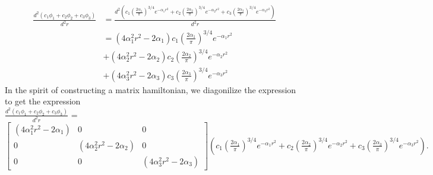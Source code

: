 \documentclass{article}
\begin{document}
\begin{align*}
    \frac{d^2(c_1 \phi_1 + c_2 \phi_2 + c_3 \phi_3)}{d^2r} &= \frac{d^2(c_1  \left( \frac{2\alpha_1}{\pi} \right)^{3/4} e^{-\alpha_1 r^2} + c_2 \left( \frac{2\alpha_2}{\pi} \right)^{3/4} e^{-\alpha_2 r^2} + c_3 \left( \frac{2\alpha_3}{\pi} \right)^{3/4} e^{-\alpha_3 r^2})}{d^2r} \\
                                                           &= (4\alpha_1^2r^2 - 2\alpha_1)c_1  \left( \frac{2\alpha_1}{\pi} \right)^{3/4} e^{-\alpha_1 r^2} \\
                                                           &+(4\alpha_2^2r^2 - 2\alpha_2)c_2  \left( \frac{2\alpha_2}{\pi} \right)^{3/4} e^{-\alpha_2 r^2}  \\
                                                           &+(4\alpha_3^2r^2 - 2\alpha_3)c_3  \left( \frac{2\alpha_3}{\pi} \right)^{3/4} e^{-\alpha_3 r^2}
\end{align*}
In the spirit of constructing a matrix hamiltonian, we diagonilize the expression to get the expression \\
 \(\frac{d^2(c_1 \phi_1 + c_2 \phi_2 + c_3 \phi_3)}{d^2r}\) = \\
$\begin{bmatrix}
    (4\alpha_1^2r^2 - 2\alpha_1) & 0 & 0\\
    0 & (4\alpha_2^2r^2 - 2\alpha_2) & 0 \\
    0& 0& (4\alpha_3^2r^2 - 2\alpha_3)
\end{bmatrix} (c_1  \left( \frac{2\alpha_1}{\pi} \right)^{3/4} e^{-\alpha_1 r^2} + c_2 \left( \frac{2\alpha_2}{\pi} \right)^{3/4} e^{-\alpha_2 r^2} + c_3 \left( \frac{2\alpha_3}{\pi} \right)^{3/4} e^{-\alpha_3 r^2}).$
\end{document}

